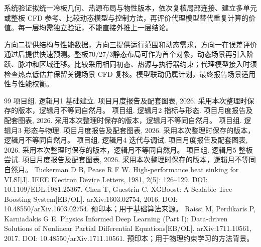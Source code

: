\documentclass[stage2,UTF8,fontset=fandol]{ydzjreport}
\begin{document}
系统验证拟统一冷板几何、热源布局与物性版本，依次复核局部连接、建立多单元或整板 CFD 参考、比较动态模型与控制方法，再评价代理模型替代重复计算的价值。每一层均需独立验证，不能直接外推上一层结论。

方向二提供结构与性能数据，方向三提供运行范围和动态需求，方向一在误差评价通过后提供快速预测。整板70/27/3静态布局可作为首个对象，动态场景再引入阶跃、脉冲和区域迁移。比较采用相同初态、热源与执行器约束；代理模型接入时须检查热点低估并保留关键场景 CFD 复核。模型联动仍属计划，最终报告场景适用性与性能权衡。
\FloatBarrier

\FloatBarrier
{}
\begin{thebibliography}{99}
 项目组. 逻辑月1 基础建立. 项目月度报告及配套图表, 2026. 采用本次整理时保存的版本，逻辑月不等同自然月。
 项目组. 逻辑月2 指标与形态. 项目月度报告及配套图表, 2026. 采用本次整理时保存的版本，逻辑月不等同自然月。
 项目组. 逻辑月3 形态与物理. 项目月度报告及配套图表, 2026. 采用本次整理时保存的版本，逻辑月不等同自然月。
 项目组. 逻辑月4 迭代与调试. 项目月度报告及配套图表, 2026. 采用本次整理时保存的版本，逻辑月不等同自然月。
 项目组. 逻辑月5 整板尝试. 项目月度报告及配套图表, 2026. 采用本次整理时保存的版本，逻辑月不等同自然月。
 Tuckerman D B, Pease R F W. High-performance heat sinking for VLSI[J]. IEEE Electron Device Letters, 1981, 2(5): 126--129. DOI: 10.1109/EDL.1981.25367.
 Chen T, Guestrin C. XGBoost: A Scalable Tree Boosting System[EB/OL]. arXiv:1603.02754, 2016. DOI: 10.48550/arXiv.1603.02754. 预印本；用于基础算法来源。
 Raissi M, Perdikaris P, Karniadakis G E. Physics Informed Deep Learning (Part I): Data-driven Solutions of Nonlinear Partial Differential Equations[EB/OL]. arXiv:1711.10561, 2017. DOI: 10.48550/arXiv.1711.10561. 预印本；用于物理约束学习的方法背景。
\end{thebibliography}
\end{document}
